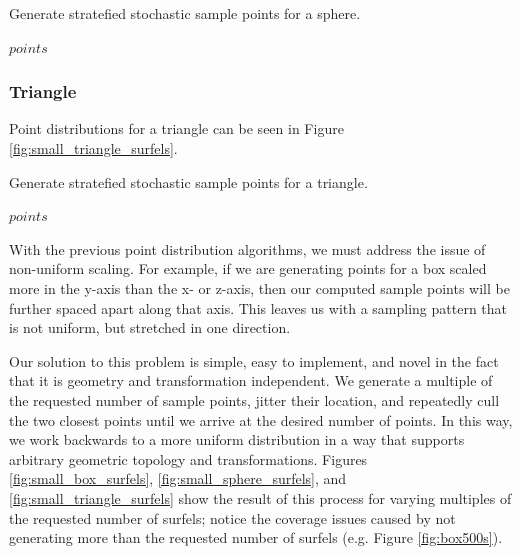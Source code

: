 \begin{algorithm}[H]
\captionfont
\caption[Sphere point generation]{Generate stratefied stochastic sample points for a sphere.}
\label{alg:sphere_point_gen}
{\fontsize{10}{9}\selectfont
\begin{algorithmic}
      \State \Return $points$
   \EndFunction
\end{algorithmic}
}
\end{algorithm}

\subsubsection{Triangle}
\label{sec:triangle_point_gen}
Point distributions for a triangle can be seen in Figure \ref{fig:small_triangle_surfels}.

\begin{algorithm}[H]
\captionfont
\caption[Triangle point generation]{Generate stratefied stochastic sample points for a triangle.}
\label{alg:triangle_point_gen}
{\fontsize{10}{9}\selectfont
\begin{algorithmic}
   \State \Return $points$
   \EndFunction
\end{algorithmic}
}
\end{algorithm}

With the previous point distribution algorithms, we must address the issue of non-uniform scaling. For example, if we are generating points for a box scaled more in the y-axis than the x- or z-axis, then our computed sample points will be further spaced apart along that axis. This leaves us with a sampling pattern that is not uniform, but stretched in one direction.

Our solution to this problem is simple, easy to implement, and novel in the fact that it is geometry and transformation independent. We generate a multiple of the requested number of sample points, jitter their location, and repeatedly cull the two closest points until we arrive at the desired number of points. In this way, we work backwards to a more uniform distribution in a way that supports arbitrary geometric topology and transformations. Figures \ref{fig:small_box_surfels}, \ref{fig:small_sphere_surfels}, and \ref{fig:small_triangle_surfels} show the result of this process for varying multiples of the requested number of surfels; notice the coverage issues caused by not generating more than the requested number of surfels (e.g. Figure \ref{fig:box500s}).

